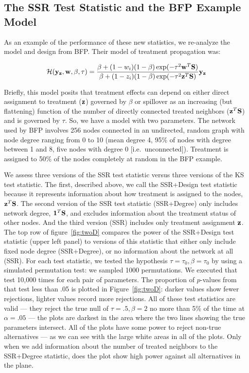 \subsection{The SSR Test Statistic and the BFP Example Model}

As an example of the performance of these new statistics, we re-analyze the
model and design from BFP. Their model of treatment propagation was:

\begin{equation}
\mathcal{H}(\mathbf{y}_{\mathbf{z}}, \mathbf{w}, \beta, \tau) =
 \frac{\beta + (1 - w_i) (1 - \beta) \exp(- \tau^2 \mathbf{w}^{T} \mathbf{S})}
      {\beta + (1 - z_i) (1 - \beta) \exp(- \tau^2 \mathbf{z}^{T} \mathbf{S})} \mathbf{y}_{\mathbf{z}}
\label{eq:spillovermodelA}
\end{equation}

Briefly, this model posits that treatment effects can depend on either direct
assignment to treatment ($\mathbf{z}$) governed by $\beta$ or spillover as an
increasing (but flattening) function of the number of directly connected
treated neighbors ($\mathbf{z}^{T} \mathbf{S}$) and is governed by $\tau$. So, we have a
model with two parameters. The network used by BFP involves 256 nodes
connected in an undirected, random graph with node degree ranging from 0 to 10
(mean degree 4, 95\% of nodes with degree between 1 and 8, five nodes with
degree 0 [i.e.\ unconnected]).  Treatment is assigned to 50\% of the nodes 
completely at random in the BFP example.

We assess three versions of the SSR test statistic versus three versions of
the KS test statistic. The first, described above, we call the SSR+Design test
statistic because it represents information about how treatment is assigned to
the nodes, $\mathbf{z}^T \mathbf{S}$. The second version of
the SSR test statistic (SSR+Degree) only includes network degree,  $\mathbf{1}^T \mathbf{S}$, and
excludes information about the treatment status of other nodes. And the
third version (SSR) includes only treatment assignment $\mathbf{z}$. The top row of
figure~\ref{fig:twoD} compares the power of the SSR+Design test statistic
(upper left panel) to versions of this statistic that either only include
fixed node degree (SSR+Degree), or no information about the network at all
(SSR). For each test statistic, we tested the hypothesis
$\tau=\tau_0,\beta=\tau_0$ by using a simulated permutation test: we
sampled 1000 permutations. We executed that test
10,000 times for each pair of parameters.  The proportion of $p$-values from
that test less than .05 is plotted in Figure~\ref{fig:twoD}: darker values
show fewer rejections, lighter values record more rejections.  All of these
test statistics are valid --- they reject the true null of $\tau=.5,\beta=2$
no more than 5\% of the time at $\alpha=.05$ --- the plots are darkest in the
area where the two lines showing the true parameters intersect. All of the
plots have some power to reject non-true alternatives --- as we can see with
the large white areas in all of the plots. Only when we add
information about the number of treated neighbors to the SSR+Degree statistic,
does the plot show high power against all alternatives in the plane.



